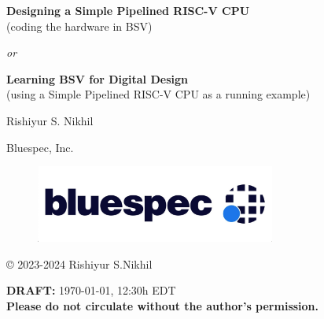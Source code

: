 
\pagestyle{empty}

\begin{center}

\vspace*{1.5in}

{\LARGE\bf Designing a Simple Pipelined RISC-V CPU} \\
{\Large (coding the hardware in BSV)}

\emph{or}

{\LARGE\bf Learning BSV for Digital Design} \\
{\Large (using a Simple Pipelined RISC-V CPU as a running example)}

\vspace{2cm}

{\Large Rishiyur S. Nikhil}

Bluespec, Inc.

\vspace*{0.5in}

\begin{figure}[htbp]
  \centerline{\includegraphics[height=1in,angle=0]{ch000_front/Bluespec_Logo_2022-10}}
\end{figure}

\vfill

\copyright{} 2023-2024 Rishiyur S.Nikhil

\vspace{0.5in}

{\bf DRAFT:} \today, 12:30h EDT \\
{\bf Please do not circulate without the author's permission.}

\end{center}


% 



\vspace*{2in}


